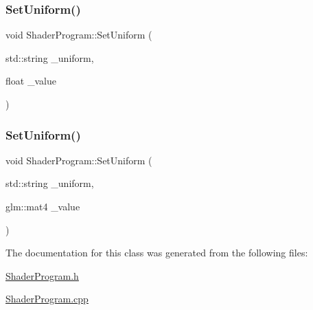 \mbox{\label{class_shader_program_a6b964df4ebf8b6258ee1989e463d9a9b}} 
\subsubsection{\texorpdfstring{Set\+Uniform()}{SetUniform()}\hspace{0.1cm}{\footnotesize\ttfamily [2/3]}}
{\footnotesize\ttfamily void Shader\+Program\+::\+Set\+Uniform (\begin{DoxyParamCaption}\item[{std\+::string}]{\+\_\+uniform,  }\item[{float}]{\+\_\+value }\end{DoxyParamCaption})}

\mbox{\label{class_shader_program_acf22820261bc06136eee4ece975fb164}} 
\subsubsection{\texorpdfstring{Set\+Uniform()}{SetUniform()}\hspace{0.1cm}{\footnotesize\ttfamily [3/3]}}
{\footnotesize\ttfamily void Shader\+Program\+::\+Set\+Uniform (\begin{DoxyParamCaption}\item[{std\+::string}]{\+\_\+uniform,  }\item[{glm\+::mat4}]{\+\_\+value }\end{DoxyParamCaption})}



The documentation for this class was generated from the following files\+:\begin{DoxyCompactItemize}
\item 
\mbox{\hyperlink{_shader_program_8h}{Shader\+Program.\+h}}\item 
\mbox{\hyperlink{_shader_program_8cpp}{Shader\+Program.\+cpp}}\end{DoxyCompactItemize}
